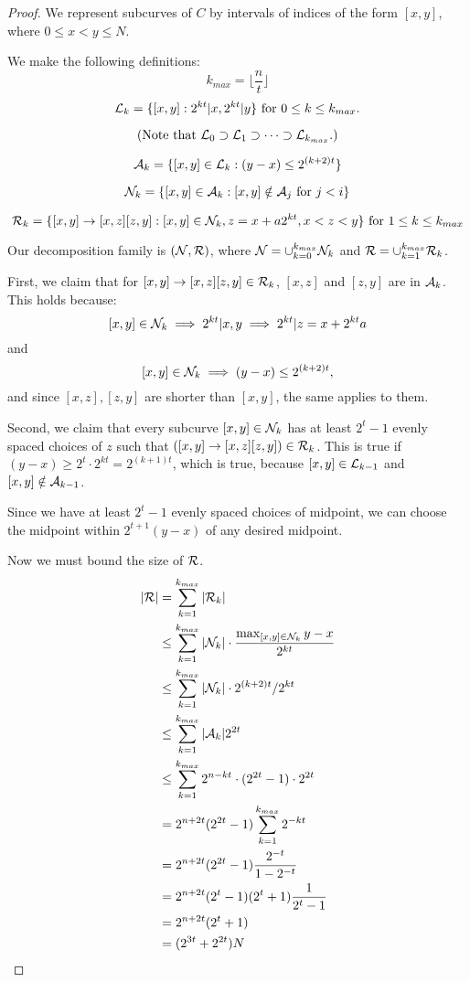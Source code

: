 \documentclass{article}
\begin{document}
\begin{proof}
We represent subcurves of $C$ by intervals of indices of the form
$[x,y]$, where $0\le x < y \le N$.

We make the following definitions:
$$k_{max} = \lfloor \frac{n}{t} \rfloor$$
$${\mathcal L}_k = \{ [x,y] : 2^{kt} | x, 2^{kt} | y \} \mbox{ for } 0 \le k \le k_{max}.$$ 

$$\mbox{(Note that } {\mathcal L}_0 \supset {\mathcal L}_1 \supset \cdots \supset {\mathcal L}_{k_{max}}.)$$

$${\mathcal A}_k = \{ [x,y] \in {\mathcal L}_k : (y-x) \le 2^{(k+2)t}\}$$

$${\mathcal N}_k = \{ [x,y] \in {\mathcal A}_k : [x,y] \notin {\mathcal A}_j \mbox{ for } j
< i \}$$

$${\mathcal R}_k = \{ [x,y] \to [x, z] [z, y] : [x,y] \in
{\mathcal N}_k, z = x + a2^{kt}, x < z < y \}\mbox{ for } 1\le k \le k_{max}$$

Our decomposition family is $({\mathcal N}, {\mathcal R})$, where
${\mathcal N} = \cup_{k=0}^{k_{max}} {\mathcal N}_k$ and
 ${\mathcal R} = \cup_{k=1}^{k_{max}} {\mathcal R}_k$.

First, we claim that for $[x,y]\to [x,z][z,y]\in {\mathcal R}_k$, $[x,z]$ and
$[z,y]$ are in ${\mathcal A}_k$. This holds because:
$$[x,y]\in {\mathcal N}_k \implies 2^{kt} | x,y \implies 2^{kt} | z = x + 2^{kt}a$$
and
$$[x,y]\in {\mathcal N}_k \implies (y-x) \le 2^{(k+2)t},$$ and since $[x,z],
[z,y]$ are shorter than $[x,y]$, the same applies to them.

Second, we claim that every subcurve $[x,y]\in {\mathcal N}_k$ has at least
$2^t - 1$ evenly spaced choices of $z$ such that $([x,y] \to [x,z]
[z,y]) \in {\mathcal R}_k$. This is true if $(y-x) \ge 2^t \cdot 2^{kt} =
2^{(k+1)t}$, which is true, because $[x,y] \in {\mathcal L}_{k-1}$ and
$[x,y]\notin {\mathcal A}_{k-1}$.

Since we have at least $2^t - 1$ evenly spaced choices of midpoint, we
can choose the midpoint within $2^{t+1} (y-x)$ of any desired
midpoint.

Now we must bound the size of ${\mathcal R}$.
\begin{align*}
|{\mathcal R}| &= \sum_{k=1}^{k_{max}} |{\mathcal R}_k| \\
&\le \sum_{k=1}^{k_{max}} |{\mathcal N}_k| \cdot \frac{\max_{[x,y]\in{\mathcal N}_k} y-x }{2^{kt}}\\
&\le \sum_{k=1}^{k_{max}} |{\mathcal N}_k| \cdot 2^{(k+2)t} / 2^{kt}\\
&\le \sum_{k=1}^{k_{max}} |{\mathcal A}_k| 2^{2t}\\
&\le \sum_{k=1}^{k_{max}} 2^{n - kt} \cdot (2^{2t} - 1) \cdot 2^{2t}\\
&= 2^{n+2t}(2^{2t}-1) \sum_{k=1}^{k_{max}} 2^{-kt}\\
&= 2^{n+2t}(2^{2t}-1) \frac{2^{-t}}{1 - 2^{-t}}\\
&= 2^{n+2t}(2^{t}-1)(2^t + 1) \frac{1}{2^t - 1}\\
&= 2^{n+2t}(2^t + 1)\\
&= (2^{3t} + 2^{2t}) N
\end{align*}

\end{proof}
\end{document}
